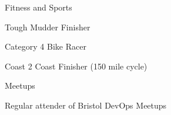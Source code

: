 

\begin{cventries}

  \cventry
    {Fitness and Sports} %
    {} %
    {} %
    {} %
    {
      \begin{cvitems} %
        \item {Tough Mudder Finisher}
        \item {Category 4 Bike Racer}
        \item {Coast 2 Coast Finisher (150 mile cycle)}
      \end{cvitems}
    }

  \cventry
    {Meetups} %
    {} %
    {} %
    {} %
    {
      \begin{cvitems} %
        \item {Regular attender of Bristol DevOps Meetups}
      \end{cvitems}
    }

\end{cventries}
